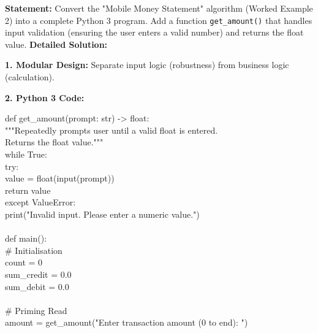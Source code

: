 \documentclass[11pt]{article}
\begin{document}
\begin{exoresolu}
\textbf{Statement:} Convert the "Mobile Money Statement" algorithm (Worked Example 2) into a complete Python 3 program. Add a function \texttt{get\_amount()} that handles input validation (ensuring the user enters a valid number) and returns the float value.
\tcblower
\textbf{Detailed Solution:}

\noindent\textbf{1. Modular Design:}
Separate input logic (robustness) from business logic (calculation).

\noindent\textbf{2. Python 3 Code:}
\begin{flushleft}
\ttfamily\small
def get\_amount(prompt: str) -> float:\\
\hspace{1em}"""\hspace{0.5em}Repeatedly prompts user until a valid float is entered.\\
\hspace{1em}Returns the float value.\hspace{0.5em}"""\\
\hspace{1em}while True:\\
\hspace{2em}try:\\
\hspace{3em}value = float(input(prompt))\\
\hspace{3em}return value\\
\hspace{2em}except ValueError:\\
\hspace{3em}print("Invalid input. Please enter a numeric value.")\\
\mbox{}\\
def main():\\
\hspace{1em}\# Initialisation\\
\hspace{1em}count = 0\\
\hspace{1em}sum\_credit = 0.0\\
\hspace{1em}sum\_debit = 0.0\\
\mbox{}\\
\hspace{1em}\# Priming Read\\
\hspace{1em}amount = get\_amount("Enter transaction amount (0 to end): ")\\

\end{flushleft}
\end{exoresolu}
\end{document}
